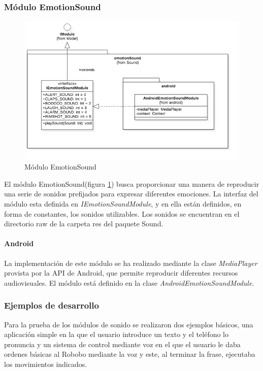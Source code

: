 \subsubsection{Módulo EmotionSound}
\begin{figure}
	\centering
	\includegraphics[width=1\linewidth]{imagenes/diagramas/EmotionSoundModule.png}
	\caption{Módulo EmotionSound}
	\label{fig:emotion-sound-module}
\end{figure}
El módulo EmotionSound(figura \ref{fig:emotion-sound-module}) busca proporcionar una manera de reproducir una serie de sonidos prefijados para expresar diferentes emociones.
La interfaz del módulo esta definida en \textit{IEmotionSoundModule}, y en ella están definidos, en forma de constantes, los sonidos utilizables.
Los sonidos se encuentran en el directorio raw de la carpeta res del paquete Sound.
\paragraph*{Android\\}

La implementación de este módulo se ha realizado mediante la clase \textit{MediaPlayer} provista por la API de Android, que permite reproducir diferentes recursos audiovisuales. El módulo está definido en la clase \textit{AndroidEmotionSoundModule}.


\subsubsection*{Ejemplos de desarrollo}

Para la prueba de los módulos de sonido se realizaron dos ejemplos básicos, una aplicación simple en la que el usuario introduce un texto y el teléfono lo pronuncia y un sistema de control mediante voz en el que el usuario le daba ordenes básicas al Robobo mediante la voz y este, al terminar la frase, ejecutaba los movimientos indicados.



